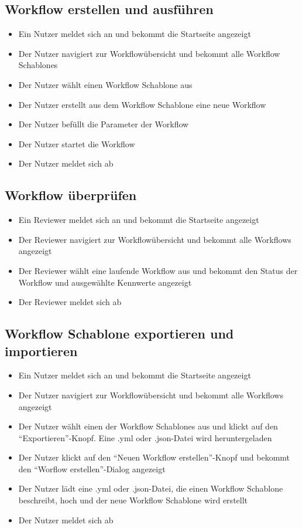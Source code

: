 \subsection*{\gls{Workflow} erstellen und ausführen}
\begin{itemize}
    \item Ein \Gls{Nutzer} meldet sich an und bekommt die Startseite angezeigt
    \item Der \Gls{Nutzer} navigiert zur Workflowübersicht und bekommt alle \glspl{Workflow Schablone}
    \item Der \gls{Nutzer} wählt einen \gls{Workflow Schablone} aus
    \item Der \gls{Nutzer} erstellt aus dem \gls{Workflow Schablone} eine neue \gls{Workflow} 
    \item Der \gls{Nutzer} befüllt die Parameter der \gls{Workflow}
    \item Der \gls{Nutzer} startet die \gls{Workflow}
    \item Der \gls{Nutzer} meldet sich ab
\end{itemize}

\newpage
\subsection*{\gls{Workflow} überprüfen}
\begin{itemize}
    \item Ein \Gls{Reviewer} meldet sich an und bekommt die Startseite angezeigt
    \item Der \Gls{Reviewer} navigiert zur Workflowübersicht und bekommt alle \glspl{Workflow} angezeigt
    \item Der \Gls{Reviewer} wählt eine laufende \gls{Workflow} aus und bekommt den Status der \gls{Workflow} und ausgewählte Kennwerte angezeigt
    \item Der \gls{Reviewer} meldet sich ab
\end{itemize}

\subsection*{\gls{Workflow Schablone} exportieren und importieren}
\begin{itemize}
    \item Ein \gls{Nutzer} meldet sich an und bekommt die Startseite angezeigt
    \item Der \gls{Nutzer} navigiert zur Workflowübersicht und bekommt alle Workflows angezeigt
    \item Der \gls{Nutzer} wählt einen der \glspl{Workflow Schablone} aus und klickt auf den \enquote{Exportieren}-Knopf. Eine .yml oder .json-Datei wird heruntergeladen
    \item Der \gls{Nutzer} klickt auf den \enquote{Neuen Workflow erstellen}-Knopf und bekommt den \enquote{Worflow erstellen}-Dialog angezeigt
    \item Der \gls{Nutzer} lädt eine .yml oder .json-Datei, die einen \gls{Workflow Schablone} beschreibt, hoch und der neue \gls{Workflow Schablone} wird erstellt
    \item Der \gls{Nutzer} meldet sich ab
\end{itemize}
\newpage
